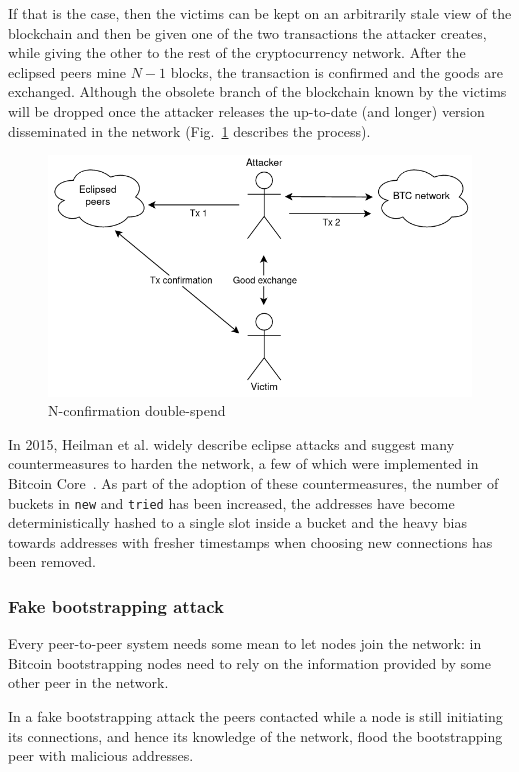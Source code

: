 \documentclass[12pt, letterpaper, twoside]{article}
\begin{document}
If that is the case, then the victims can be kept on an arbitrarily stale view of the blockchain and then be given one of the two transactions the attacker creates, while giving the other to the rest of the cryptocurrency network. After the eclipsed peers mine $N - 1$ blocks, the transaction is confirmed and the goods are exchanged. Although the obsolete branch of the blockchain known by the victims will be dropped once the attacker releases the up-to-date (and longer) version disseminated in the network (Fig.~\ref{fig:nconfirm} describes the process).  

\begin{figure}[h!]
	\includegraphics[width=.75\textwidth]{pict/nconfirm-doublespend.png}
	\centering
	\caption{N-confirmation double-spend}
	\label{fig:nconfirm}
\end{figure}

In 2015, Heilman et al. widely describe eclipse attacks and suggest many countermeasures to harden the network, a few of which were implemented in Bitcoin Core~\cite{eclipseatk}. As part of the adoption of these countermeasures, the number of buckets in \texttt{new} and \texttt{tried} has been increased, the addresses have become deterministically hashed to a single slot inside a bucket and the heavy bias towards addresses with fresher timestamps when choosing new connections has been removed.


\subsubsection{Fake bootstrapping attack}\label{sec:fakeboot}
Every peer-to-peer system needs some mean to let nodes join the network: in Bitcoin bootstrapping nodes need to rely on the information provided by some other peer in the network.

In a fake bootstrapping attack the peers contacted while a node is still initiating its connections, and hence its knowledge of the network, flood the bootstrapping peer with malicious addresses.
\end{document}
